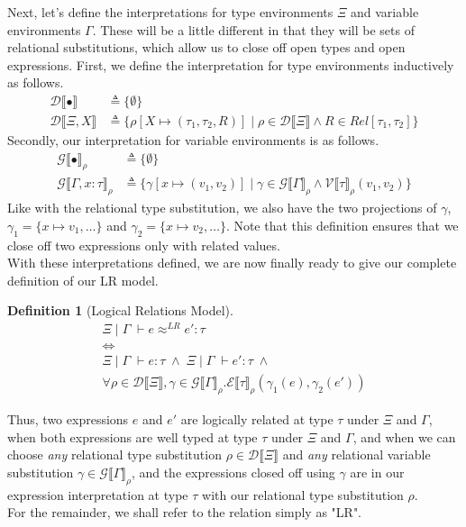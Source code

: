 \documentclass[twoside,11pt,openright]{report}
\theoremstyle{definition}
\newtheorem{definition}{Definition}[section]
\newcommand{\var}{x}
\newcommand{\expr}{e}
\newcommand{\val}{v}
\newcommand{\Tvar}{X}
\newcommand{\typ}{\tau}
\newcommand{\venv}{\Gamma}
\newcommand{\tenv}{\Xi}
\newcommand{\emptenv}{\bullet}
\newcommand{\empvenv}{\bullet}
\newcommand{\jdg}[4]{#1 \; | \; #2 \; \vdash #3 : #4}
\newcommand{\jdgRel}[6]{#1 \; | \; #2 \; \vdash #3 \approx^{#4} #5 : #6}
\newcommand{\ValInp}[2]{\mathcal{V} \llbracket #1 \rrbracket_{#2}}
\newcommand{\ValInpGen}[2]{\ValInp{#1}{#2}(\val_1, \val_2)}
\newcommand{\ExpInp}[2]{\mathcal{E} \llbracket #1 \rrbracket_{#2}}
\newcommand{\VenvInp}[2]{\mathcal{G} \llbracket #1 \rrbracket_{#2}}
\newcommand{\TenvInp}[1]{\mathcal{D} \llbracket #1 \rrbracket}
\newcommand{\LogRel}[5]{\jdgRel{#1}{#2}{#3}{LR}{#4}{#5}}
\newcommand{\map}[2]{#1 \mapsto #2}
\begin{document}
Next, let's define the interpretations for type environments $\tenv$ and variable environments $\venv$. These will be a little different in that they will be sets of relational substitutions, which allow us to close off open types and open expressions. First, we define the interpretation for type environments inductively as follows.
\begin{align*}
  \TenvInp{\emptenv} &\triangleq \{ \emptyset \}\\
  \TenvInp{\tenv, \Tvar} &\triangleq \{\rho[\map{\Tvar}{(\typ_1, \typ_2, R)}] \mid \rho \in \TenvInp{\tenv} \land R \in Rel[\typ_1, \typ_2]\}
\end{align*}
Secondly, our interpretation for variable environments is as follows.
\begin{align*}
  \VenvInp{\empvenv}{\rho} &\triangleq \{ \emptyset \}\\
  \VenvInp{\venv, \var : \typ}{\rho} &\triangleq \{\gamma[\map{\var}{(\val_1, \val_2)}] \mid \gamma \in \VenvInp{\venv}{\rho} \land \ValInpGen{\typ}{\rho}\}
\end{align*}
Like with the relational type substitution, we also have the two projections of $\gamma$, $\gamma_1 = \{\var \mapsto \val_1, \dots\}$ and $\gamma_2 = \{\var \mapsto \val_2, \dots\}$. Note that this definition ensures that we close off two expressions only with related values.\\
With these interpretations defined, we are now finally ready to give our complete definition of our LR model.
\begin{definition}[Logical Relations Model]\label{def:LogRel}
  \begin{equation*}
    \begin{gathered}
      \LogRel{\tenv}{\venv}{\expr}{\expr'}{\typ}\\
      \iff\\
      \jdg{\tenv}{\venv}{\expr}{\typ} \; \land \; \jdg{\tenv}{\venv}{\expr'}{\typ} \; \land\\
      \forall \rho \in \TenvInp{\tenv}, \gamma \in \VenvInp{\venv}{\rho} . 
      \ExpInp{\typ}{\rho}(\gamma_1(\expr), \gamma_2(\expr'))
    \end{gathered}
  \end{equation*}
\end{definition}
Thus, two expressions $\expr$ and $\expr'$ are logically related at type $\typ$ under $\tenv$ and $\venv$, when both expressions are well typed at type $\typ$ under $\tenv$ and $\venv$, and when we can choose \textit{any} relational type substitution $\rho \in \TenvInp{\tenv}$ and \textit{any} relational variable substitution $\gamma \in \VenvInp{\venv}{\rho}$, and the expressions closed off using $\gamma$ are in our expression interpretation at type $\typ$ with our relational type substitution $\rho$.\\
For the remainder, we shall refer to the relation simply as "LR".
\end{document}
